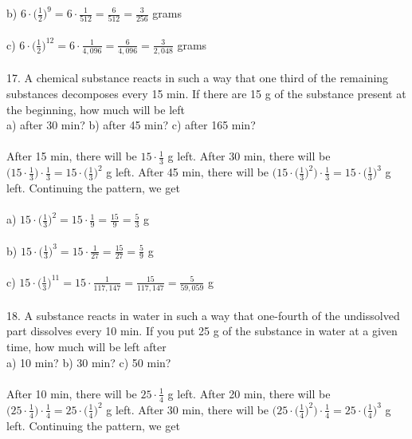 \documentclass[12pt]{article}
\begin{document}
b) $6\cdot \bigg(\displaystyle \frac{1}{2}\bigg)^9=6\cdot \displaystyle \frac{1}{512}=\displaystyle \frac{6}{512}=\displaystyle \frac{3}{256}$ grams \\
\\
c) $6\cdot \bigg(\displaystyle \frac{1}{2}\bigg)^{12}=6\cdot \displaystyle \frac{1}{4,096}=\displaystyle \frac{6}{4,096}=\displaystyle \frac{3}{2,048}$ grams \\
\\
17. A chemical substance reacts in such a way that one third of the remaining substances decomposes every 15 min. If there are 15 g of the substance present at the beginning, how much will be left \\
a) after 30 min? \hfill b) after 45 min? \hfill c) after 165 min? \\
\\
After 15 min, there will be $15\cdot \displaystyle \frac{1}{3}$ g left. After 30 min, there will be $\bigg(15\cdot \displaystyle \frac{1}{3}\bigg)\cdot \displaystyle \frac{1}{3}=15\cdot \bigg(\displaystyle \frac{1}{3}\bigg)^2$ g left. After 45 min, there will be $\bigg(15\cdot \bigg(\displaystyle \frac{1}{3}\bigg)^2\bigg)\cdot \displaystyle \frac{1}{3}=15\cdot \bigg(\displaystyle \frac{1}{3}\bigg)^3$ g left. Continuing the pattern, we get \\
\\
a) $15\cdot \bigg(\displaystyle \frac{1}{3}\bigg)^2=15\cdot \displaystyle \frac{1}{9}=\displaystyle \frac{15}{9}=\displaystyle \frac{5}{3}$ g \\
\\
b) $15\cdot \bigg(\displaystyle \frac{1}{3}\bigg)^3=15\cdot \displaystyle \frac{1}{27}=\displaystyle \frac{15}{27}=\displaystyle \frac{5}{9}$ g \\
\\
c) $15\cdot \bigg(\displaystyle \frac{1}{3}\bigg)^{11}=15\cdot \displaystyle \frac{1}{117,147}=\displaystyle \frac{15}{117,147}=\displaystyle \frac{5}{59,059}$ g \\
\\
18. A substance reacts in water in such a way that one-fourth of the undissolved part dissolves every 10 min. If you put 25 g of the substance in water at a given time, how much will be left after \\
a) 10 min? \hfill b) 30 min? \hfill c) 50 min? \\
\\
After 10 min, there will be $25\cdot \displaystyle \frac{1}{4}$ g left. After 20 min, there will be $\bigg(25\cdot \displaystyle \frac{1}{4}\bigg)\cdot \displaystyle \frac{1}{4}=25\cdot \bigg(\displaystyle \frac{1}{4}\bigg)^2$ g left. After 30 min, there will be $\bigg(25\cdot \bigg(\displaystyle \frac{1}{4}\bigg)^2\bigg)\cdot \displaystyle \frac{1}{4}=25\cdot \bigg(\displaystyle \frac{1}{4}\bigg)^3$ g left. Continuing the pattern, we get \\
\end{document}
